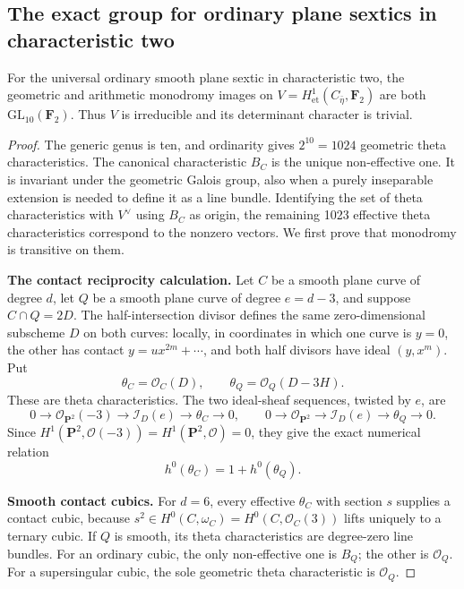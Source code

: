 \subsection{The exact group for ordinary plane sextics in characteristic two}
\label{subsec:sextic-exact}

\begin{theorem}\label{thm:sextic-full-monodromy}
For the universal ordinary smooth plane sextic in characteristic two,
the geometric and arithmetic monodromy images on
$V=H^1_{\mathrm{et}}(C_{\bar\eta},\mathbf F_2)$ are both
$\mathrm{GL}_{10}(\mathbf F_2)$.  Thus $V$ is irreducible and its
determinant character is trivial.
\end{theorem}

\begin{proof}
The generic genus is ten, and ordinarity gives $2^{10}=1024$
geometric theta characteristics.  The canonical characteristic $B_C$
is the unique non-effective one.  It is invariant under the
geometric Galois group, also when a purely inseparable extension is
needed to define it as a line bundle.  Identifying the set of theta
characteristics with $V^\vee$ using $B_C$ as origin, the remaining
1023 effective theta characteristics correspond to the nonzero
vectors.  We first prove that monodromy is transitive on them.

\par\smallskip\noindent\textbf{The contact reciprocity calculation.}
Let $C$ be a smooth plane curve of degree $d$, let $Q$ be a smooth
plane curve of degree $e=d-3$, and suppose $C\cap Q=2D$.
The half-intersection divisor defines the same zero-dimensional
subscheme $D$ on both curves: locally, in coordinates in which one
curve is $y=0$, the other has contact $y=u x^{2m}+\cdots$, and both
half divisors have ideal $(y,x^m)$.
Put
\[
 \theta_C=\mathcal O_C(D),\qquad
 \theta_Q=\mathcal O_Q(D-3H).
\]
These are theta characteristics.  The two ideal-sheaf sequences,
twisted by $e$, are
\[
 0\to\mathcal O_{\mathbf P^2}(-3)\to\mathcal I_D(e)
       \to\theta_C\to0,
 \qquad
 0\to\mathcal O_{\mathbf P^2}\to\mathcal I_D(e)
       \to\theta_Q\to0.
\]
Since $H^1(\mathbf P^2,\mathcal O(-3))=H^1(\mathbf P^2,\mathcal O)=0$,
they give the exact numerical relation
\begin{equation}\label{eq:contact-reciprocity}
 h^0(\theta_C)=1+h^0(\theta_Q).
\end{equation}

\par\smallskip\noindent\textbf{Smooth contact cubics.}
For $d=6$, every effective $\theta_C$ with section $s$ supplies a
contact cubic, because $s^2\in H^0(C,\omega_C)=H^0(C,\mathcal O_C(3))$
lifts uniquely to a ternary cubic.
If $Q$ is smooth, its theta characteristics are degree-zero line
bundles.  For an ordinary cubic, the only non-effective one is $B_Q$;
the other is $\mathcal O_Q$.  For a supersingular cubic, the sole
geometric theta characteristic is $\mathcal O_Q$.


\end{proof}
